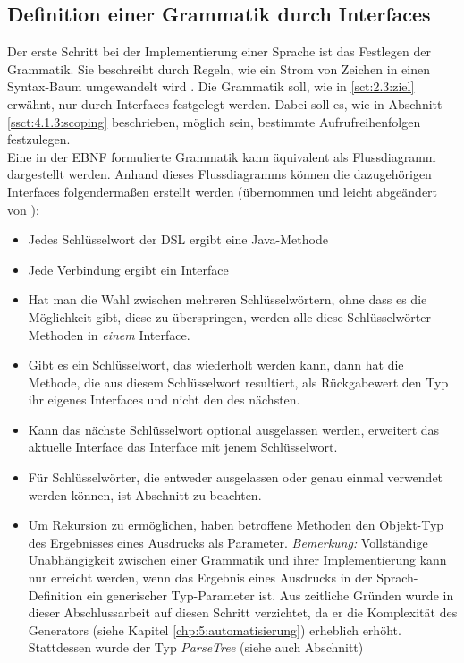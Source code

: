 \subsection{Definition einer Grammatik durch Interfaces}\label{ssct:4.3.1:grammatik}
Der erste Schritt bei der Implementierung einer Sprache ist das Festlegen der Grammatik. Sie beschreibt durch Regeln, wie ein Strom von Zeichen in einen Syntax-Baum umgewandelt wird \cite{book:fowlerDSL}. Die Grammatik soll, wie in \ref{sct:2.3:ziel} erwähnt, nur durch Interfaces festgelegt werden. Dabei soll es, wie in Abschnitt \ref{ssct:4.1.3:scoping} beschrieben, möglich sein, bestimmte Aufrufreihenfolgen festzulegen.\\ Eine in der EBNF formulierte Grammatik kann äquivalent als Flussdiagramm dargestellt werden. Anhand dieses Flussdiagramms können die dazugehörigen Interfaces folgendermaßen erstellt werden (übernommen und leicht abgeändert von \cite{www:jooq:fluentAPI}):

\begin{itemize}
	\item Jedes Schlüsselwort der DSL ergibt eine Java-Methode
	\item Jede Verbindung ergibt ein Interface
	\item Hat man die Wahl zwischen mehreren Schlüsselwörtern, ohne dass es die Möglichkeit gibt, diese zu überspringen, werden alle diese Schlüsselwörter Methoden in \emph{einem} Interface.
	\item Gibt es ein Schlüsselwort, das wiederholt werden kann, dann hat die Methode, die aus diesem Schlüsselwort resultiert, als Rückgabewert den Typ ihr eigenes Interfaces und nicht den des nächsten.
	\item Kann das nächste Schlüsselwort optional ausgelassen werden, erweitert das aktuelle Interface das Interface mit jenem Schlüsselwort.
	\item Für Schlüsselwörter, die entweder ausgelassen oder genau einmal verwendet werden können, ist Abschnitt  zu beachten.
	\item Um Rekursion zu ermöglichen, haben betroffene Methoden den Objekt-Typ des Ergebnisses eines Ausdrucks als Parameter. \emph{Bemerkung:} Vollständige Unabhängigkeit zwischen einer Grammatik und ihrer Implementierung kann nur erreicht werden, wenn das Ergebnis eines Ausdrucks in der Sprach-Definition ein generischer Typ-Parameter ist. Aus zeitliche Gründen wurde in dieser Abschlussarbeit auf diesen Schritt verzichtet, da er die Komplexität des Generators (siehe Kapitel \ref{chp:5:automatisierung}) erheblich erhöht. Stattdessen wurde der Typ \emph{ParseTree} (siehe auch Abschnitt)
\end{itemize}

